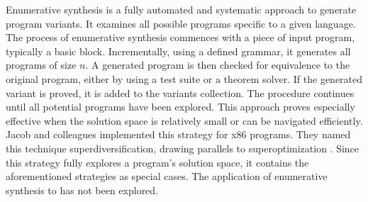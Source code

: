 
\begin{strategy}
    \label{enumerative_synthesis}
    Enumerative synthesis is a fully automated and systematic approach to generate program variants.
    It examines all possible programs specific to a given language.
    The process of enumerative synthesis commences with a piece of input program, typically a basic block.
    Incrementally, using a defined grammar, it generates all programs of size $n$.
    A generated program is then checked for equivalence to the original program, either by using a test suite or a theorem solver.
    If the generated variant is proved, it is added to the variants collection.
    The procedure continues until all potential programs have been explored.
    This approach proves especially effective when the solution space is relatively small or can be navigated efficiently.
    Jacob and colleagues \cite{jacob2008superdiversifier} implemented this strategy for x86 programs.
    They named this technique superdiversification, drawing parallels to superoptimization \cite{Massalin1987}.
    Since this strategy fully explores a program's solution space, it contains the aforementioned strategies as special cases.
    The application of enumerative synthesis to \Wasm has not been explored. 
\end{strategy}



